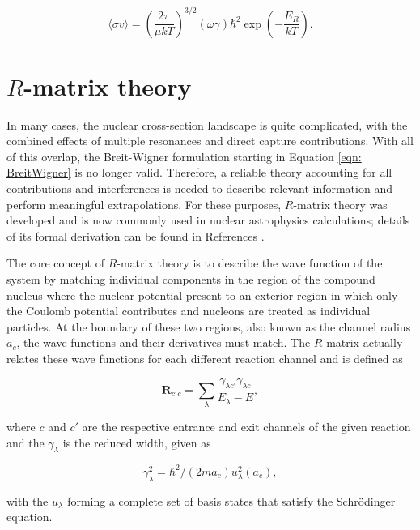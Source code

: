 \begin{equation}
\langle \sigma v \rangle = \left(  \dfrac{2 \pi}{\mu k T} \right)^{3/2} (\omega \gamma) \hbar^{2} \exp \left( - \dfrac{E_{R}}{k T} \right).
\end{equation}



\section{$R$-matrix theory}
\label{sec: r-matrix}

In many cases, the nuclear cross-section landscape is quite complicated, with the combined effects of multiple resonances and direct capture contributions. With all of this overlap, the Breit-Wigner formulation starting in Equation \ref{eqn: BreitWigner} is no longer valid. Therefore, a reliable theory accounting for all contributions and interferences is needed to describe relevant information and perform meaningful extrapolations. For these purposes, $R$-matrix theory was developed and is now commonly used in nuclear astrophysics calculations; details of its formal derivation can be found in References \cite{Lane1958, Azuma2010}. 

The core concept of $R$-matrix theory is to describe the wave function of the system by matching individual components in the region of the compound nucleus where the nuclear potential present to an exterior region in which only the Coulomb potential contributes and nucleons are treated as individual particles. At the boundary of these two regions, also known as the channel radius $a_{c}$, the wave functions and their derivatives must match. The $R$-matrix actually relates these wave functions for each different reaction channel and is defined as

\begin{equation}
\mathbf{R}_{c' c} =  \sum_\lambda \frac{\gamma_{\lambda c'}\gamma_{\lambda c}}{E_\lambda-E},
\label{eqn: Rmatrix}
\end{equation}

\noindent where $c$ and $c'$ are the respective entrance and exit channels of the given reaction and the $\gamma_{\lambda}$ is the reduced width, given as

\begin{equation}
\gamma_\lambda^2 = \hbar^2/(2m a_c)u_\lambda^2(a_c),
\end{equation}

\noindent with the $u_{\lambda}$ forming a complete set of basis states that satisfy the Schr\"odinger  equation. 


